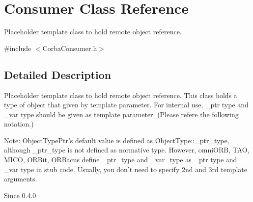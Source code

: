 \section{Consumer Class Reference}
\label{classConsumer}


Placeholder template class to hold remote object reference.  




{\ttfamily \#include $<$CorbaConsumer.h$>$}



\subsection{Detailed Description}
Placeholder template class to hold remote object reference. This class holds a type of object that given by template parameter. For internal use, \_\-ptr type and \_\-var type should be given as template parameter. (Please refere the following notation.)

Note: ObjectTypePtr's default value is defined as ObjectType::\_\-ptr\_\-type, although \_\-ptr\_\-type is not defined as normative type. However, omniORB, TAO, MICO, ORBit, ORBacus define \_\-ptr\_\-type and \_\-var\_\-type as \_\-ptr type and \_\-var type in stub code. Usually, you don't need to specify 2nd and 3rd template arguments.

\begin{DoxySince}{Since}
0.4.0 
\end{DoxySince}
